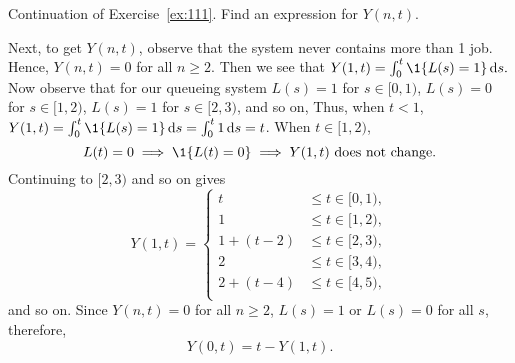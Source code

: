 \begin{exercise}\label{ex:112} Continuation of Exercise~\ref{ex:111}. 
Find an expression for $Y(n,t)$. 
    \begin{solution}
      Next, to get $Y(n,t)$, observe that the system never contains
      more than 1 job. Hence, $Y(n,t)=0$ for all $n\geq 2$.  Then we see that
      $Y(1,t) = \int_0^t \1{L(s) = 1}\d s.$ Now observe that for our
      queueing system $L(s)=1$ for $s\in[0,1)$, $L(s)=0$ for
      $s\in[1,2)$, $L(s)=1$ for $s\in[2,3)$, and so on, Thus, when
      $t<1$, $Y(1,t)=\int_0^t \1{L(s)=1} \d s = \int_0^t 1\d s = t$.
      When $t\in[1,2)$, 
      \begin{equation*}
        L(t)=0 \implies \1{L(t)=0} \implies Y(1,t) \text{ does not change}.
      \end{equation*}
Continuing to $[2,3)$ and so on gives
    \begin{equation*}
      Y(1,t) =
      \begin{cases}
        t &\leq t\in[0,1), \\
        1 &\leq t\in[1,2), \\
        1+(t-2) &\leq t\in[2,3), \\
        2 &\leq t\in[3,4), \\
        2+(t-4) &\leq t\in[4,5), \\
      \end{cases}
    \end{equation*}
    and so on.  Since $Y(n,t)=0$ for all $n\geq 2$, $L(s) = 1$ or
    $L(s)=0$ for all $s$, therefore, 
    \begin{equation*}
      Y(0,t) = t-Y(1,t).
    \end{equation*}
    \end{solution}
\end{exercise}


